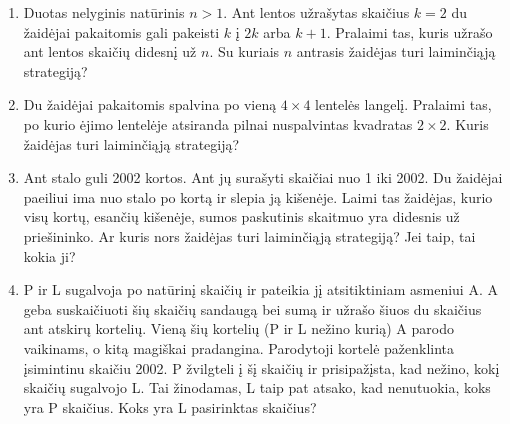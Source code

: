 \begin{enumerate}
  \item Duotas nelyginis natūrinis $n>1$. Ant lentos užrašytas skaičius $k=2$ du
    žaidėjai pakaitomis gali pakeisti $k$ į $2k$ arba $k+1$. Pralaimi tas, kuris
    užrašo ant lentos skaičių didesnį už $n$. Su kuriais $n$ antrasis žaidėjas
    turi laiminčiąją strategiją? 

  \item  Du žaidėjai pakaitomis spalvina po vieną  $4\times 4$ lentelės langelį.
    Pralaimi tas, po kurio ėjimo lentelėje atsiranda pilnai nuspalvintas
    kvadratas  $2\times 2$. Kuris žaidėjas turi laiminčiąją strategiją?

  \item Ant stalo guli 2002 kortos. Ant jų surašyti skaičiai nuo 1 iki 2002. Du
    žaidėjai paeiliui ima nuo stalo po kortą ir slepia ją kišenėje. Laimi tas
    žaidėjas, kurio visų kortų, esančių kišenėje, sumos paskutinis skaitmuo yra
    didesnis už priešininko. Ar kuris nors žaidėjas turi laiminčiąją strategiją?
    Jei taip, tai kokia ji? 

  \item P ir L sugalvoja po natūrinį skaičių ir pateikia jį atsitiktiniam
    asmeniui A. A geba suskaičiuoti šių skaičių sandaugą bei sumą ir užrašo šiuos
    du skaičius ant atskirų kortelių. Vieną šių kortelių (P ir L nežino kurią) A
    parodo vaikinams, o kitą magiškai pradangina. Parodytoji kortelė paženklinta
    įsimintinu skaičiu 2002. P žvilgteli į šį skaičių ir prisipažįsta, kad
    nežino, kokį skaičių sugalvojo L. Tai žinodamas, L taip pat atsako, kad
    nenutuokia, koks yra P skaičius. Koks yra L pasirinktas skaičius? 


\end{enumerate}
